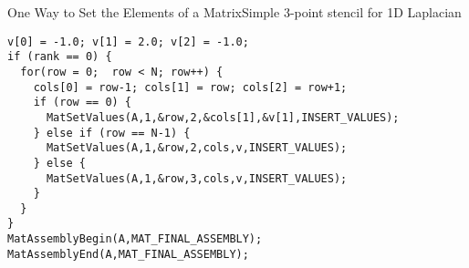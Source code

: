 \begin{frame}[fragile]{One Way to Set the Elements of a Matrix}{Simple 3-point stencil for 1D Laplacian}
\small
\begin{verbatim}
v[0] = -1.0; v[1] = 2.0; v[2] = -1.0;
if (rank == 0) {
  for(row = 0;  row < N; row++) {
    cols[0] = row-1; cols[1] = row; cols[2] = row+1;
    if (row == 0) {
      MatSetValues(A,1,&row,2,&cols[1],&v[1],INSERT_VALUES);
    } else if (row == N-1) {
      MatSetValues(A,1,&row,2,cols,v,INSERT_VALUES);
    } else {
      MatSetValues(A,1,&row,3,cols,v,INSERT_VALUES);
    }
  }
}
MatAssemblyBegin(A,MAT_FINAL_ASSEMBLY);
MatAssemblyEnd(A,MAT_FINAL_ASSEMBLY);
\end{verbatim}
\end{frame}
